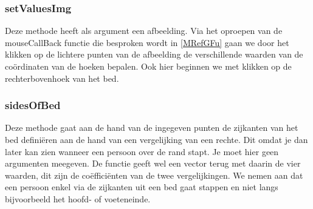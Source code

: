 \subsubsection{setValuesImg}
Deze methode heeft als argument een afbeelding. Via het oproepen van de mouseCallBack functie die besproken wordt in \ref{MRefGFu} gaan we door het klikken op de lichtere punten van de afbeelding de verschillende waarden van de co\"ordinaten van de hoeken bepalen. Ook hier beginnen we met klikken op de rechterbovenhoek van het bed. 

\subsubsection{sidesOfBed}
Deze methode gaat aan de hand van de ingegeven punten de zijkanten van het bed defini\"eren aan de hand van een vergelijking van een rechte. Dit omdat je dan later kan zien wanneer een persoon over de rand stapt. Je moet hier geen argumenten meegeven. De functie geeft wel een vector terug met daarin de vier waarden, dit zijn de co\"effici\"enten van de twee vergelijkingen. We nemen aan dat een persoon enkel via de zijkanten uit een bed gaat stappen en niet langs bijvoorbeeld het hoofd- of voeteneinde.

